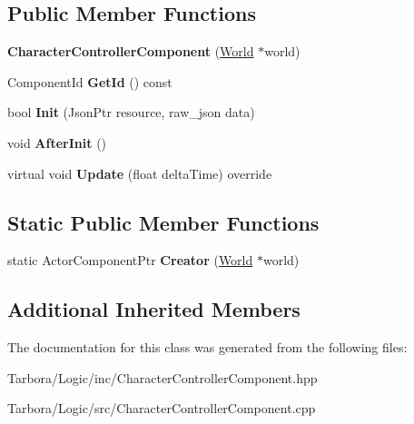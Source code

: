 \subsection*{Public Member Functions}
\begin{DoxyCompactItemize}
\item 
\mbox{\label{classTarbora_1_1CharacterControllerComponent_a2973a925ac0459deaa9fd7d390c66e3f}} 
{\bfseries Character\+Controller\+Component} (\hyperlink{classTarbora_1_1World}{World} $\ast$world)
\item 
\mbox{\label{classTarbora_1_1CharacterControllerComponent_a5929fff77727c8bee445736b6a4c69d8}} 
Component\+Id {\bfseries Get\+Id} () const
\item 
\mbox{\label{classTarbora_1_1CharacterControllerComponent_aa70e4199ad42f87528ef0366d3b62b53}} 
bool {\bfseries Init} (Json\+Ptr resource, raw\+\_\+json data)
\item 
\mbox{\label{classTarbora_1_1CharacterControllerComponent_a3e909ef055662f0f898f19cc5212482c}} 
void {\bfseries After\+Init} ()
\item 
\mbox{\label{classTarbora_1_1CharacterControllerComponent_a302d5f23db1b6b1053ed9c5c2b24f093}} 
virtual void {\bfseries Update} (float delta\+Time) override
\end{DoxyCompactItemize}
\subsection*{Static Public Member Functions}
\begin{DoxyCompactItemize}
\item 
\mbox{\label{classTarbora_1_1CharacterControllerComponent_a01fd385c667b068703620d6a3e59fdf9}} 
static Actor\+Component\+Ptr {\bfseries Creator} (\hyperlink{classTarbora_1_1World}{World} $\ast$world)
\end{DoxyCompactItemize}
\subsection*{Additional Inherited Members}


The documentation for this class was generated from the following files\+:\begin{DoxyCompactItemize}
\item 
Tarbora/\+Logic/inc/Character\+Controller\+Component.\+hpp\item 
Tarbora/\+Logic/src/Character\+Controller\+Component.\+cpp\end{DoxyCompactItemize}
